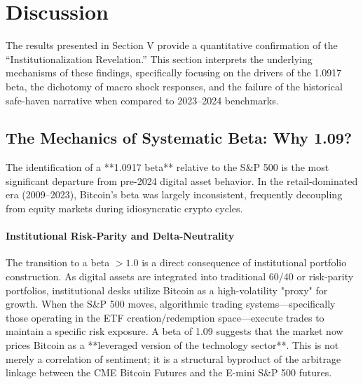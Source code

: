 \documentclass[10pt, conference, compsocconf]{IEEEtran}
\begin{document}


\section{Discussion}

The results presented in Section V provide a quantitative confirmation of the ``Institutionalization Revelation.'' This section interprets the underlying mechanisms of these findings, specifically focusing on the drivers of the 1.0917 beta, the dichotomy of macro shock responses, and the failure of the historical safe-haven narrative when compared to 2023--2024 benchmarks.


\subsection{The Mechanics of Systematic Beta: Why 1.09?}

The identification of a **1.0917 beta** relative to the S\&P 500 is the most significant departure from pre-2024 digital asset behavior. In the retail-dominated era (2009--2023), Bitcoin’s beta was largely inconsistent, frequently decoupling from equity markets during idiosyncratic crypto cycles.

\paragraph{Institutional Risk-Parity and Delta-Neutrality}
The transition to a beta $> 1.0$ is a direct consequence of institutional portfolio construction. As digital assets are integrated into traditional 60/40 or risk-parity portfolios, institutional desks utilize Bitcoin as a high-volatility "proxy" for growth. When the S\&P 500 moves, algorithmic trading systems—specifically those operating in the ETF creation/redemption space—execute trades to maintain a specific risk exposure. A beta of 1.09 suggests that the market now prices Bitcoin as a **leveraged version of the technology sector**. This is not merely a correlation of sentiment; it is a structural byproduct of the arbitrage linkage between the CME Bitcoin Futures and the E-mini S\&P 500 futures.
\end{document}
